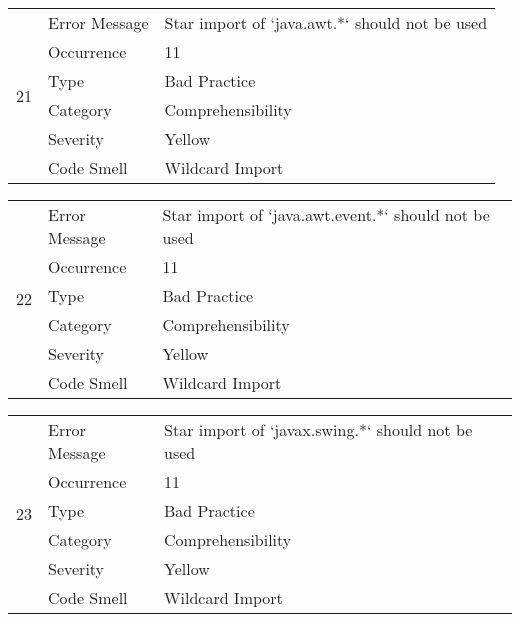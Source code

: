 \documentclass[12pt,english]{article}
\begin{document}
\begin{table}[!ht]
    \begin{tabularx}{\textwidth}{|c|l|X|}
    \hline
        \multirow{6}{*}{21} & Error Message & Star import of `java.awt.*` should not be used \\ \cline{2-3}
        & Occurrence & 11 \\ \cline{2-3}
        & Type & Bad Practice \\ \cline{2-3}
        & Category & Comprehensibility \\ \cline{2-3}
        & Severity & Yellow \\ \cline{2-3}
        & Code Smell & Wildcard Import \\ \hline
    \end{tabularx}
\end{table}

\begin{table}[!ht]
    \begin{tabularx}{\textwidth}{|c|l|X|}
    \hline
        \multirow{6}{*}{22} & Error Message & Star import of `java.awt.event.*` should not be used \\ \cline{2-3}
        & Occurrence & 11 \\ \cline{2-3}
        & Type & Bad Practice \\ \cline{2-3}
        & Category & Comprehensibility \\ \cline{2-3}
        & Severity & Yellow \\ \cline{2-3}
        & Code Smell & Wildcard Import \\ \hline
    \end{tabularx}
\end{table}


\begin{table}[!ht]
    \begin{tabularx}{\textwidth}{|c|l|X|}
    \hline
        \multirow{6}{*}{23} & Error Message & Star import of `javax.swing.*` should not be used \\ \cline{2-3}
        & Occurrence & 11 \\ \cline{2-3}
        & Type & Bad Practice \\ \cline{2-3}
        & Category & Comprehensibility \\ \cline{2-3}
        & Severity & Yellow \\ \cline{2-3}
        & Code Smell & Wildcard Import \\ \hline
    \end{tabularx}
\end{table}
\end{document}
